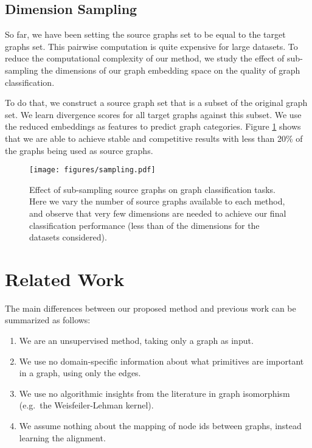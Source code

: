 \documentclass[sigconf]{acmart}
\begin{document}
\subsection{Dimension Sampling}
\label{sec:sampling}
So far, we have been setting the source graphs set to be equal to the target graphs set.
This pairwise computation is quite expensive for large datasets.
To reduce the computational complexity of our method, we study the effect of sub-sampling the dimensions of our graph embedding space on the quality of graph classification.

To do that, we  construct a source graph set that is a subset of the original graph set.
We learn divergence scores for all target graphs against this subset.
We use the reduced embeddings as features to predict graph categories.
Figure \ref{fig:sampling} shows that we are able to achieve stable and competitive results with less than 20\% of the graphs being used as source graphs.

\begin{figure}
    \centering
    \texttt{[image: figures/sampling.pdf]}
    \caption{Effect of sub-sampling source graphs on graph classification tasks.  Here we vary the number of source graphs available to each method, and observe that very few dimensions are needed to achieve our final classification performance (less than  of the dimensions for the datasets considered).}
    \label{fig:sampling}
\end{figure}

\section{Related Work}

The main differences between our proposed method and
previous work can be summarized as follows:
\begin{enumerate}
\item We are an unsupervised method, taking only a graph as input.
\item We use no domain-specific information about what primitives are important in a graph, using only the edges.
\item We use no algorithmic insights from the literature in graph isomorphism (e.g.\ the Weisfeiler-Lehman kernel).
\item We assume nothing about the mapping of node ids between graphs, instead learning the alignment.
\end{enumerate}
\end{document}
